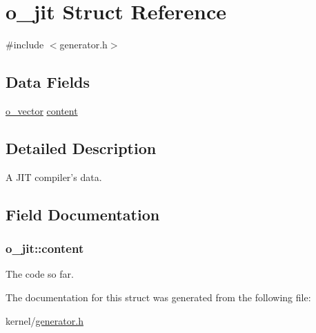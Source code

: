 \hypertarget{structo__jit}{\section{o\-\_\-jit Struct Reference}
\label{structo__jit}
}


{\ttfamily \#include $<$generator.\-h$>$}

\subsection*{Data Fields}
\begin{DoxyCompactItemize}
\item 
\hyperlink{structo__vector}{o\-\_\-vector} \hyperlink{structo__jit_a95c483b2e7a478193e7a60ade28a28e3}{content}
\end{DoxyCompactItemize}


\subsection{Detailed Description}
A J\-I\-T compiler's data. 

\subsection{Field Documentation}
\hypertarget{structo__jit_a95c483b2e7a478193e7a60ade28a28e3}{
\subsubsection[{content}]{ o\-\_\-jit\-::content}}\label{structo__jit_a95c483b2e7a478193e7a60ade28a28e3}
The code so far. 

The documentation for this struct was generated from the following file\-:\begin{DoxyCompactItemize}
\item 
kernel/\hyperlink{generator_8h}{generator.\-h}\end{DoxyCompactItemize}
